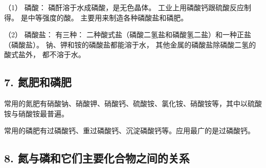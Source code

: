 （1） 磷酸： 磷酐溶于水成磷酸，是无色晶体。
工业上用磷酸钙跟硫酸反应制得。 是中等强度的酸。
主要用来制造各种磷酸盐和磷肥。

（2） 磷酸盐： 有三种：
二种酸式盐（磷酸二氢盐和磷酸氢二盐）和一种正盐（磷酸盐）。
钠、钾和铵的磷酸盐都能溶于水， 其他金属的磷酸盐除磷酸二氢的酸式盐外，
都不溶于水。

\subsection{7. 氮肥和磷肥}

常用的氮肥有硝酸钠、硝酸钾、硝酸钙、硫酸铵、氯化铵、硝酸铵等，其中以硫酸铵与硝酸铵最普遍。

常用的磷肥有过磷酸钙、重过磷酸钙、沉淀磷酸钙等。应用最广的是过磷酸钙。

\subsection{8. 氮与磷和它们主要化合物之间的关系}

